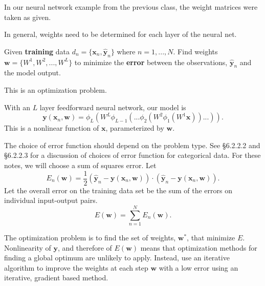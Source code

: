 \documentclass[12pt,letterpaper,noanswers]{exam}
\newcommand{\vc}[1]{\boldsymbol{#1}}
\newcommand{\note}[1]{{#1}} %
\begin{document}
\note{
In our neural network example from the previous class, the weight matrices were taken as given.

In general, weights need to be determined for each layer of the neural net.
\begin{tcolorbox}
Given \textbf{training} data $d_n = \{\vc{x}_n,\hat{\vc{y}}_n\}$ where $n=1,...,N$.  Find weights $\vc{w} = \{W^1,W^2,...,W^L\}$ to minimize the \textbf{error} between the observations, $\hat{\vc{y}}_n$ and the model output.

This is an optimization problem.

\end{tcolorbox}

With an $L$ layer feedforward neural network, our model is \[\vc{y}(\vc{x}_n,\vc{w}) = \phi_L(W^L\phi_{L-1}(...\phi_2(W^2\phi_1(W^1\vc{x}))...)).\] This is a nonlinear function of $\vc{x}$, parameterized by $\vc{w}$.

The choice of error function should depend on the problem type.  See \cite{Goodfellow-et-al-2016} \S 6.2.2.2 and \S 6.2.2.3 for a discussion of choices of error function for categorical data.  For these notes, we will choose a sum of squares error.  Let \[E_n(\vc{w}) = \dfrac{1}{2}\left(\hat{\vc{y}}_n-\vc{y}(\vc{x}_n,\vc{w})\right)\cdot\left(\hat{\vc{y}}_n-\vc{y}(\vc{x}_n,\vc{w})\right).\]
Let the overall error on the training data set be the sum of the errors on individual input-output pairs.
\[E(\vc{w}) = \sum\limits_{n=1}^N E_n(\vc{w}).\]

The optimization problem is to find the set of weights, $\vc{w}^*$, that minimize $E$.  Nonlinearity of $\vc{y}$, and therefore of $E(\vc{w})$ means that optimization methods for finding a global optimum are unlikely to apply. Instead, use an iterative algorithm to improve the weights at each step $\vc{w}$ with a low error using an iterative, gradient based method.  

}
\end{document}
